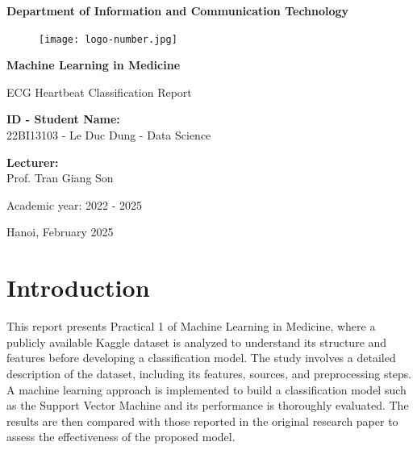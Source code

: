 \documentclass[a4paper,12pt]{article}
\begin{document}
\begin{titlepage}
    \centering
    \vspace*{1cm}
    
    {\LARGE \bfseries Department of Information and Communication Technology \par}
    \begin{figure}
        \centering
        \texttt{[image: logo-number.jpg]}
    \end{figure}
    
    \vspace{2cm}
    
    {\Huge \bfseries Machine Learning in Medicine \par}
    
    \vspace{1cm}
    
    {\Large ECG Heartbeat Classification Report \par}
    
    \vfill
    
    \begin{minipage}{0.5\textwidth}
        \begin{flushleft}
            {\large \textbf{ID - Student Name:}} \\
            22BI13103 - Le Duc Dung - Data Science
        \end{flushleft}
    \end{minipage}%
    \begin{minipage}{0.5\textwidth}
        \begin{flushright}
            {\large \textbf{Lecturer:}} \\
            Prof. Tran Giang Son
        \end{flushright}
    \end{minipage}
    
    \vspace{2cm}
    
    {\large Academic year: 2022 - 2025} \par
    
    \vspace{1cm}
    
    {\large Hanoi, February 2025}
    
\end{titlepage}

\section{Introduction}
This report presents Practical 1 of Machine Learning in Medicine, where a publicly available Kaggle dataset is analyzed to understand its structure and features before developing a classification model. The study involves a detailed description of the dataset, including its features, sources, and preprocessing steps. A machine learning approach is implemented to build a classification model such as the Support Vector Machine and its performance is thoroughly evaluated. The results are then compared with those reported in the original research paper to assess the effectiveness of the proposed model.
\end{document}
